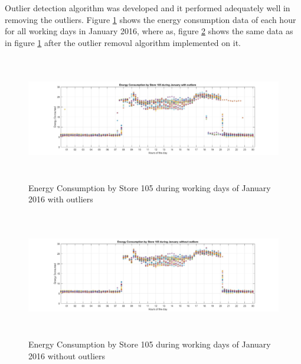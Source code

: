 \documentclass[conference]{IEEEtran}
\begin{document}
Outlier detection algorithm was developed and it performed adequately well in removing the outliers. Figure \ref{fig:OLX} shows the energy consumption data of each hour for all working days in January 2016, where as, figure \ref{fig:OLX1} shows the
same data as in figure \ref{fig:OLX} after the outlier removal algorithm implemented
on it.
\begin{figure}[h]
	\centering
	\includegraphics[width=13cm,height=5.5cm]{xxx.jpg}
	\caption{Energy Consumption by Store 105 during working days of January
		2016 with outliers}
	\label{fig:OLX}
\end{figure}
\begin{figure}[h]
	\centering
	\includegraphics[width=13cm,height=5.5cm]{yyy.jpg}
	\caption{Energy Consumption by Store 105 during working days of January
		2016 without outliers}
	\label{fig:OLX1}
\end{figure}
\end{document}
